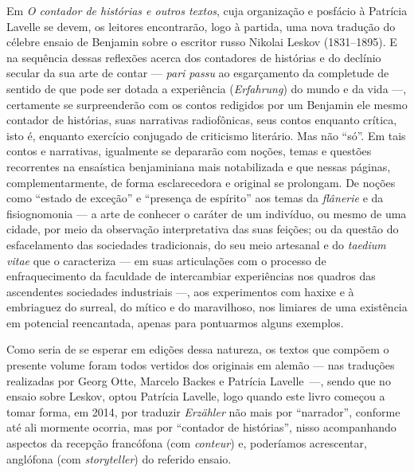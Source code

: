 Em \emph{O contador de histórias e outros textos}, cuja organização e posfácio à
Patrícia Lavelle se devem, os leitores encontrarão,
logo à partida, uma nova tradução do célebre ensaio de Benjamin sobre o
escritor russo Nikolai Leskov (1831--1895). E na sequência dessas
reflexões acerca dos contadores de histórias e do declínio secular da sua
arte de contar --- \emph{pari passu} ao esgarçamento da completude de
sentido de que pode ser dotada a experiência (\emph{Erfahrung}) do mundo
e da vida ---, certamente se surpreenderão com os contos redigidos por um
Benjamin ele mesmo contador de histórias, suas narrativas radiofônicas,
seus contos enquanto crítica, isto é, enquanto exercício conjugado de
criticismo literário. Mas não ``só''. Em tais contos e narrativas,
igualmente se depararão com noções, temas e questões recorrentes na
ensaística benjaminiana mais notabilizada e que nessas páginas,
complementarmente, de forma esclarecedora e original se prolongam. De
noções como ``estado de exceção'' e ``presença de espírito'' aos temas da \emph{flânerie} e da fisiognomonia --- a arte de conhecer o caráter de um indivíduo, ou mesmo
de uma cidade, por meio da observação interpretativa das suas feições;
ou da questão do esfacelamento das sociedades tradicionais, do seu meio
artesanal e do \emph{taedium vitae} que o caracteriza --- em suas
articulações com o processo de enfraquecimento da faculdade de
intercambiar experiências nos quadros das ascendentes sociedades
\mbox{industriais} ---, aos experimentos com haxixe e à embriaguez do surreal,
do mítico e do maravilhoso, nos limiares de uma existência em potencial
reencantada, apenas para pontuarmos alguns exemplos.


Como seria de se esperar em edições dessa natureza, os textos que
compõem o presente volume foram todos vertidos dos originais em alemão
--- nas traduções realizadas por Georg Otte, Marcelo Backes
e Patrícia Lavelle~---, sendo que no ensaio sobre
Leskov, optou Patrícia Lavelle, logo quando este livro começou a tomar
forma, em 2014, por traduzir \emph{Erzähler} não mais por ``narrador'',
conforme até ali mormente ocorria, mas por ``contador de histórias'',
nisso acompanhando aspectos da recepção francófona (com
\emph{conteur}) e, poderíamos acrescentar, anglófona (com
\emph{storyteller}) do referido ensaio.

